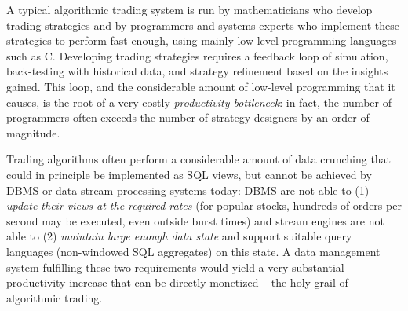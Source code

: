 A typical algorithmic trading system is run by mathematicians who develop
trading strategies and by programmers and systems experts who implement these
strategies to perform fast enough, using mainly low-level programming languages
such as C. Developing trading strategies requires a feedback loop of simulation,
back-testing with historical data, and strategy refinement based on the insights
gained. This loop, and the considerable amount of low-level programming that it
causes, is the root of a very costly {\em productivity bottleneck}\/: in fact,
the number of programmers often exceeds the number of strategy designers by
an order of magnitude.



Trading algorithms often perform a considerable amount of data crunching that
could in principle be implemented as SQL views, but cannot be achieved by DBMS
or data stream processing systems today: DBMS are not able to (1) {\em update
their views at the required rates}\/ (for popular stocks, hundreds of orders per
second may be executed, even outside burst times) and stream engines are not
able to (2) {\em maintain large enough data state}\/ and support suitable query
languages (non-windowed SQL aggregates) on this state.
A data management system fulfilling these two requirements would yield a very
substantial productivity increase that can be directly monetized -- the holy
grail of algorithmic trading.



